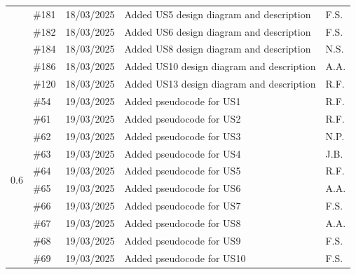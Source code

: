 \documentclass[a4paper]{project}
\begin{document}
\begin{center}
\begin{tabular}{|l|l|l|l|l|}
				                      & \#181     & 18/03/2025                  & Added US5 design diagram and description  & F.S.                   \\
				                      & \#182     & 18/03/2025                  & Added US6 design diagram and description  & F.S.                   \\
				                      & \#184     & 18/03/2025                  & Added US8 design diagram and description  & N.S.                   \\
				                      & \#186     & 18/03/2025                  & Added US10 design diagram and description & A.A.                   \\
				                      & \#120     & 18/03/2025                  & Added US13 design diagram and description & R.F.                   \\ \hline
				\multirow{18}{*}{0.6} & \#54      & 19/03/2025                  & Added pseudocode for US1                  & R.F.                   \\
				                      & \#61      & 19/03/2025                  & Added pseudocode for US2                  & R.F.                   \\
				                      & \#62      & 19/03/2025                  & Added pseudocode for US3                  & N.P.                   \\
				                      & \#63      & 19/03/2025                  & Added pseudocode for US4                  & J.B.                   \\
				                      & \#64      & 19/03/2025                  & Added pseudocode for US5                  & R.F.                   \\
				                      & \#65      & 19/03/2025                  & Added pseudocode for US6                  & A.A.                   \\
				                      & \#66      & 19/03/2025                  & Added pseudocode for US7                  & F.S.                   \\
				                      & \#67      & 19/03/2025                  & Added pseudocode for US8                  & A.A.                   \\
				                      & \#68      & 19/03/2025                  & Added pseudocode for US9                  & F.S.                   \\
				                      & \#69      & 19/03/2025                  & Added pseudocode for US10                 & F.S.                   \\

\end{tabular}
\end{center}
\end{document}
